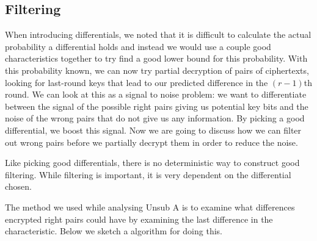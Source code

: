 \documentclass[12pt,a4paper]{article}
\begin{document}
\subsection{Filtering}
\label{sec:filtering}
When introducing differentials, we noted that it is difficult to calculate the
actual probability a differential holds and instead we would use a couple good
characteristics together to try find a good lower bound for this probability.
With this probability known, we can now try partial decryption of pairs of
ciphertexts, looking for last-round keys that lead to our predicted difference
in the $(r-1)$th round. We can
look at this as a signal to noise problem: we want to differentiate between the
signal of the possible right pairs giving us potential key bits and the noise of the
wrong pairs that do not give us any information. By picking a good differential,
we boost this signal. Now we are going to discuss how we can filter out wrong
pairs before we partially decrypt them in order to reduce the noise.

Like picking good differentials, there is no deterministic way to construct
good filtering. While filtering is important, it is very dependent on the
differential chosen. 

The method we used while analysing Unsub A is to examine
what differences encrypted right pairs could have by examining the last
difference in the characteristic. Below we sketch a algorithm for doing this.
\end{document}
